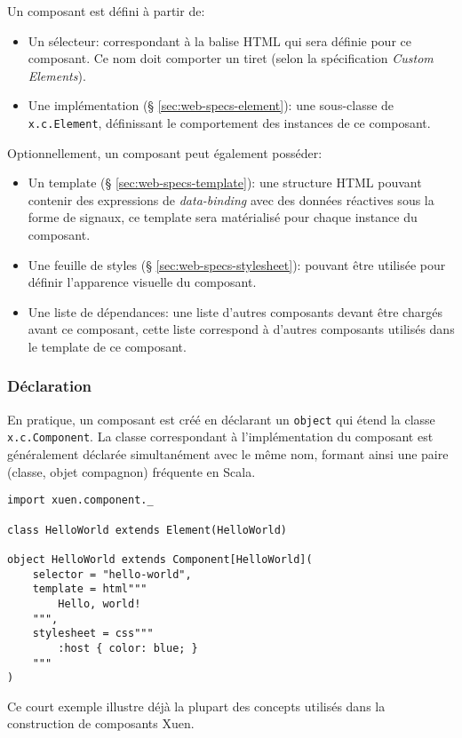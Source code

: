 Un composant est défini à partir de:
\begin{itemize}
	\item Un sélecteur: correspondant à la balise HTML qui sera définie pour ce composant. Ce nom doit comporter un tiret (selon la spécification \emph{Custom Elements}).
	\item Une implémentation (§ \ref{sec:web-specs-element}): une sous-classe de \texttt{x.c.Element}, définissant le comportement des instances de ce composant.
\end{itemize}
Optionnellement, un composant peut également posséder:
\begin{itemize}
	\item Un template (§ \ref{sec:web-specs-template}): une structure HTML pouvant contenir des expressions de \emph{data-binding} avec des données réactives sous la forme de signaux, ce template sera matérialisé pour chaque instance du composant.
	\item Une feuille de styles (§ \ref{sec:web-specs-stylesheet}): pouvant être utilisée pour définir l'apparence visuelle du composant.
	\item Une liste de dépendances: une liste d'autres composants devant être chargés avant ce composant, cette liste correspond à d'autres composants utilisés dans le template de ce composant.
\end{itemize}

\subsubsection{Déclaration}
En pratique, un composant est créé en déclarant un \texttt{object} qui étend la classe \texttt{x.c.Component}. La classe correspondant à l'implémentation du composant est généralement déclarée simultanément avec le même nom, formant ainsi une paire (classe, objet compagnon) fréquente en Scala.

\begin{lstlisting}
import xuen.component._

class HelloWorld extends Element(HelloWorld)

object HelloWorld extends Component[HelloWorld](
	selector = "hello-world",
	template = html"""
		Hello, world!
	""",
	stylesheet = css"""
		:host { color: blue; }
	"""
)
\end{lstlisting}

Ce court exemple illustre déjà la plupart des concepts utilisés dans la construction de composants Xuen.

